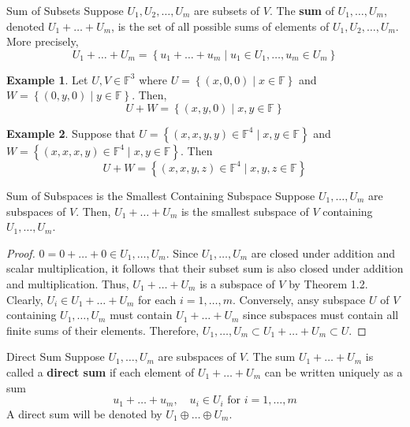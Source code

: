 \documentclass{book}
\newcommand{\field}{\mathbb{F}}
\newcommand{\set}[2]{\left\{#1\;\vert\;#2\right\}}
\theoremstyle{definition}
\newtheorem*{example}{Example}
\begin{document}
\begin{definition}{Sum of Subsets}
    Suppose $U_1,U_2,\dots,U_m$ are subsets of $V$. The \textbf{sum} of
    $U_1,\dots,U_m$, denoted $U_1+\dots+U_m$, is the set of all possible sums of
    elements of $U_1,U_2,\dots,U_m$. More precisely,
    \[
        U_1+\dots+U_m = \set{u_1+\dots+u_m}{u_1\in U_1,\dots,u_m\in U_m} 
    \]
\end{definition}

\begin{example}
    Let $U,V \in \field^3$ where $U = \set{(x,0,0)}{x\in\field}$ and $W =
    \set{(0,y,0)}{y\in\field}$. Then,
    \begin{equation*}
        U+W = \set{(x,y,0)}{x,y\in\field} 
    \end{equation*}
\end{example}

\begin{example}
    Suppose that $U = \set{(x,x,y,y)\in\field^4}{x,y\in\field}$ and $W =
    \set{(x,x,x,y)\in\field^4}{x,y\in\field}$. Then
    \[
        U+W = \set{(x,x,y,z)\in\field^4}{x,y,z\in\field} 
    \]
\end{example}

\begin{thm}{Sum of Subspaces is the Smallest Containing Subspace}
    Suppose $U_1,\dots,U_m$ are subspaces of $V$. Then, $U_1+\dots+U_m$ is the
    smallest subspace of $V$ containing $U_1,\dots,U_m$.
\end{thm}

\begin{proof}
    $0 = 0+\dots+0\in U_1,\dots,U_m$. Since $U_1,\dots,U_m$ are closed under
    addition and scalar multiplication, it follows that their subset sum is also 
    closed under addition and multiplication. Thus, $U_1+\dots+U_m$ is a
    subspace of $V$ by Theorem 1.2.
    Clearly, $U_i \in U_1+\dots+U_m$ for each $i = 1,\dots,m$. Conversely, ansy
    subspace $U$ of $V$ containing $U_1,\dots,U_m$ must contain $U_1+\dots+U_m$
    since subspaces must contain all finite sums of their elements. Therefore,
    $U_1,\dots,U_m\subset U_1+\dots+U_m \subset U$.
\end{proof}

\begin{definition}{Direct Sum}
    Suppose $U_1,\dots,U_m$ are subspaces of $V$. The sum $U_1+\dots+U_m$ is
    called a \textbf{direct sum} if each element of $U_1+\dots+U_m$ can be
    written uniquely as a sum
    \[
        u_1+\dots+u_m, \quad u_i\in U_i \text{ for } i=1,\dots,m
    \]
    A direct sum will be denoted by $U_1\oplus\dots\oplus U_m$.
\end{definition}
\end{document}
